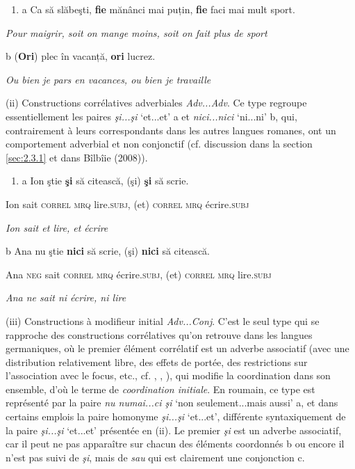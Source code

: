 \begin{enumerate}
\item a  Ca să slăbeşti, \textbf{fie} mănânci mai puțin, \textbf{fie} faci mai mult sport.


\end{enumerate}
{\itshape
Pour maigrir, soit on mange moins, soit on fait plus de sport}

  b  (\textbf{Ori}) plec în vacanță, \textbf{ori} lucrez.

{\itshape
Ou bien je pars en vacances, ou bien je travaille}

(ii) Constructions corrélatives adverbiales \textit{Adv...Adv}. Ce type regroupe essentiellement les paires \textit{şi...şi} `et...et' a et \textit{nici...nici} `ni...ni' b, qui, contrairement à leurs correspondants dans les autres langues romanes, ont un comportement adverbial et non conjonctif (cf. discussion dans la section \ref{sec:2.3.1} et dans Bîlbîie (2008)).


\begin{enumerate}
\item \label{bkm:Ref301463209}a  Ion  ştie  \textbf{şi}  să  citească,  (şi)  \textbf{şi}  să  scrie.


\end{enumerate}
Ion  sait  \textsc{correl  mrq  } lire.\textsc{subj},  (et)  \textsc{correl  mrq}  écrire.\textsc{subj} 

{\itshape
Ion sait et lire, et écrire}

  b  Ana  nu  ştie  \textbf{nici}  să  scrie,  (şi)  \textbf{nici}  să  citească.

    Ana  \textsc{neg}  sait  \textsc{correl  mrq}  écrire.\textsc{subj},  (et)  \textsc{correl  mrq}  lire\textsc{.subj}

    \textit{Ana ne sait ni écrire, ni lire}

(iii) Constructions à modifieur initial \textit{Adv...Conj}. C'est le seul type qui se rapproche des constructions corrélatives qu'on retrouve dans les langues germaniques, où le premier élément corrélatif est un adverbe associatif (avec une distribution relativement libre, des effets de portée, des restrictions sur l'association avec le focus, etc., cf. \citet{Hendriks2004}, \citet{Johannessen2005}, \citet{Hofmeister2010}), qui modifie la coordination dans son ensemble, d'où le terme de \textit{coordination initiale}. En roumain, ce type est représenté par la paire \textit{nu numai...ci şi} `non seulement...mais aussi' a, et dans certains emplois la paire homonyme \textit{şi...şi} `et...et', différente syntaxiquement de la paire \textit{şi...şi} `et...et' présentée en (ii). Le premier \textit{şi} est un adverbe associatif, car il peut ne pas apparaître sur chacun des éléments coordonnés b ou encore il n'est pas suivi de \textit{şi}, mais de \textit{sau} qui est clairement une conjonction c. 


